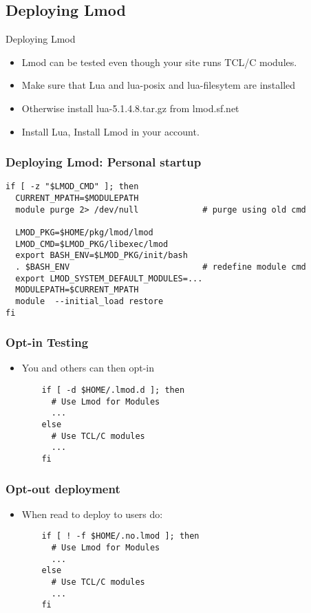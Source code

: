 \documentclass{beamer}
\begin{document}
\subsection{Deploying Lmod}
\label{sec:deploying_lmod}

\begin{frame}{Deploying Lmod}
  \begin{itemize}
    \item Lmod can be tested even though your site runs TCL/C modules.
    \item Make sure that Lua and lua-posix and lua-filesytem are installed
    \item Otherwise install lua-5.1.4.8.tar.gz from lmod.sf.net
    \item Install Lua, Install Lmod in your account.
  \end{itemize}
\end{frame}

\begin{frame}[fragile]
    \frametitle{Deploying Lmod: Personal startup}
    {\small
\begin{verbatim}
if [ -z "$LMOD_CMD" ]; then
  CURRENT_MPATH=$MODULEPATH
  module purge 2> /dev/null             # purge using old cmd

  LMOD_PKG=$HOME/pkg/lmod/lmod
  LMOD_CMD=$LMOD_PKG/libexec/lmod
  export BASH_ENV=$LMOD_PKG/init/bash
  . $BASH_ENV                           # redefine module cmd
  export LMOD_SYSTEM_DEFAULT_MODULES=...
  MODULEPATH=$CURRENT_MPATH
  module  --initial_load restore
fi
\end{verbatim}
}
\end{frame}

\begin{frame}[fragile]
    \frametitle{Opt-in Testing}
  \begin{itemize}
    \item You and others can then opt-in 
    {\small
\begin{verbatim}
    if [ -d $HOME/.lmod.d ]; then
      # Use Lmod for Modules
      ...
    else
      # Use TCL/C modules
      ...
    fi
\end{verbatim}
}
  \end{itemize}
\end{frame}

\begin{frame}[fragile]
    \frametitle{Opt-out deployment}
  \begin{itemize}
    \item When read to deploy to users do:
    {\small
\begin{verbatim}
    if [ ! -f $HOME/.no.lmod ]; then
      # Use Lmod for Modules
      ...
    else
      # Use TCL/C modules
      ...
    fi

\end{verbatim}
}
  \end{itemize}
\end{frame}
\end{document}
